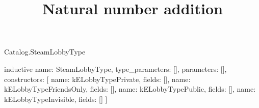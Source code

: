 \begin{lexlean}{Catalog.SteamLobbyType}
\title{Natural number addition}
\begin{semanticmodule}
inductive{
  name: SteamLobbyType,
  type_parameters: [],
  parameters: [],
  constructors: [
    {name: kELobbyTypePrivate, fields: []},
    {name: kELobbyTypeFriendsOnly, fields: []},
    {name: kELobbyTypePublic, fields: []},
    {name: kELobbyTypeInvisible, fields: []}
  ]
}
\end{semanticmodule}
\end{lexlean}
